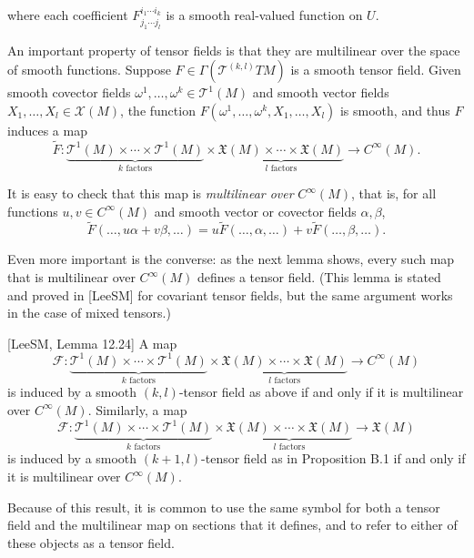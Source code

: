 where each coefficient $F^{i_1 \cdots i_k}_{j_1 \cdots j_l}$ is a smooth real-valued function on $U$.

An important property of tensor fields is that they are multilinear over the space of smooth functions. Suppose $F \in \Gamma(\mathcal{T}^{(k,l)} T M)$ is a smooth tensor field. Given smooth covector fields $\omega^1, \ldots, \omega^k \in \mathcal{T}^1(M)$ and smooth vector fields $X_1, \ldots, X_l \in \mathcal{X}(M)$, the function $F(\omega^1, \ldots, \omega^k, X_1, \ldots, X_l)$ is smooth, and thus $F$ induces a map
\[
\tilde{F}: \underbrace{\mathcal{T}^1(M) \times \cdots \times \mathcal{T}^1(M)}_{k \text{ factors}} \times \underbrace{\mathfrak{X}(M) \times \cdots \times \mathfrak{X}(M)}_{l \text{ factors}} \to C^\infty(M).
\]

It is easy to check that this map is \emph{multilinear over} $C^\infty(M)$, that is, for all functions $u, v \in C^\infty(M)$ and smooth vector or covector fields $\alpha, \beta$,
\[
\tilde{F}(\ldots, u\alpha + v\beta, \ldots) = u\tilde{F}(\ldots, \alpha, \ldots) + v\tilde{F}(\ldots, \beta, \ldots).
\]

Even more important is the converse: as the next lemma shows, every such map that is multilinear over $C^\infty(M)$ defines a tensor field. (This lemma is stated and proved in [LeeSM] for covariant tensor fields, but the same argument works in the case of mixed tensors.)

\begin{lemma}
\label{lem:tensor-characterization-lemma}


[LeeSM, Lemma 12.24] A map
\[
\mathcal{F}: \underbrace{\mathcal{T}^1(M) \times \cdots \times \mathcal{T}^1(M)}_{k \text{ factors}} \times \underbrace{\mathfrak{X}(M) \times \cdots \times \mathfrak{X}(M)}_{l \text{ factors}} \to C^\infty(M)
\]
is induced by a smooth $(k,l)$-tensor field as above if and only if it is multilinear over $C^\infty(M)$. Similarly, a map
\[
\mathcal{F}: \underbrace{\mathcal{T}^1(M) \times \cdots \times \mathcal{T}^1(M)}_{k \text{ factors}} \times \underbrace{\mathfrak{X}(M) \times \cdots \times \mathfrak{X}(M)}_{l \text{ factors}} \to \mathfrak{X}(M)
\]
is induced by a smooth $(k+1,l)$-tensor field as in Proposition B.1 if and only if it is multilinear over $C^\infty(M)$.
\end{lemma}

Because of this result, it is common to use the same symbol for both a tensor field and the multilinear map on sections that it defines, and to refer to either of these objects as a tensor field.


